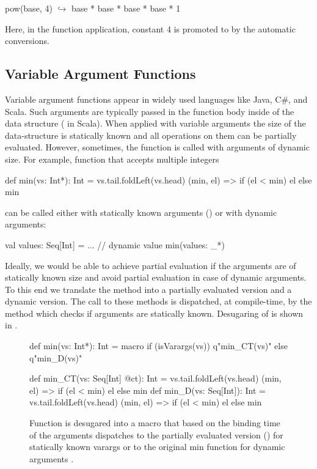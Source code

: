 \begin{lstparagraph}
pow(base, 4)
  $\hookrightarrow$ base * base * base * base * 1
\end{lstparagraph}

Here, in the function application, constant 4 is promoted to  by the automatic
conversions. 

\subsection{Variable Argument Functions}
\label{sct:varargs}

Variable argument functions appear in widely used languages like Java, C\#, and Scala.
 Such arguments are typically passed in the function body inside of the data structure
 (\eg {} in Scala). When applied with variable arguments the size of the
 data-structure is statically known and all operations on them can be partially
 evaluated. However, sometimes, the function is called with arguments of dynamic size.
 For example, function  that accepts multiple integers\begin{lstparagraph}
def min(vs: Int*): Int =
  vs.tail.foldLeft(vs.head){ (min, el) => if (el < min) el else min }
\end{lstparagraph}can be called either with statically known arguments
 (\eg {}) or with dynamic arguments:\begin{lstparagraph}
val values: Seq[Int] = ... // dynamic value
min(values: _*)
\end{lstparagraph}

Ideally, we would be able to achieve partial evaluation if the arguments are of statically
known size and avoid partial evaluation in case of dynamic arguments. To this end we translate
the method  into a partially evaluated version and a dynamic version. The call to these
methods is dispatched, at compile-time, by the  method which checks if
arguments are statically known. Desugaring of  is shown in .

\begin{figure}
\begin{listing}
def min(vs: Int*): Int = macro
  if (isVarargs(vs)) q"min_CT(vs)"
  else q"min_D(vs)"

def min_CT(vs: Seq[Int] @ct): Int =
  vs.tail.foldLeft(vs.head){ (min, el) => if (el < min) el else min }
def min_D(vs: Seq[Int]): Int =
  vs.tail.foldLeft(vs.head){ (min, el) => if (el < min) el else min }
\end{listing}
\caption{Function  is desugared into a  macro that based on the
binding time of the arguments dispatches to the partially evaluated version ()
for statically known varargs or to the original min function for dynamic arguments .}
\label{fig:min}
\end{figure}

